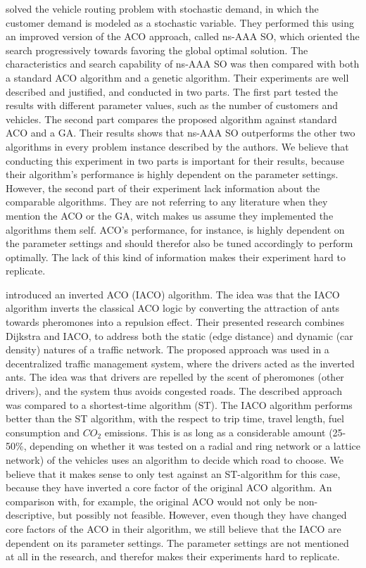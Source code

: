 \citet{tripathi09} solved the vehicle routing problem with stochastic demand, in which the customer demand is modeled as a stochastic variable. They performed this using an improved version of the ACO approach, called ns-AAA SO, which oriented the search progressively towards favoring the global optimal solution. The characteristics and search capability of ns-AAA SO was then compared with both a standard ACO algorithm and a genetic algorithm. Their experiments are well described and justified, and conducted in two parts. The first part tested the results with different parameter values, such as the number of customers and vehicles. The second part compares the proposed algorithm against standard ACO and a GA. Their results shows that ns-AAA SO outperforms the other two algorithms in every problem instance described by the authors. We believe that conducting this experiment in two parts is important for their results, because their algorithm's performance is highly dependent on the parameter settings. However, the second part of their experiment lack information about the comparable algorithms. They are not referring to any literature when they mention the ACO or the GA, witch makes us assume they implemented the algorithms them self. ACO's performance, for instance, is highly dependent on the parameter settings and should therefor also be tuned accordingly to perform optimally. The lack of this kind of information makes their experiment hard to replicate. 

\citet{dias14} introduced an inverted ACO (IACO) algorithm. The idea was that the IACO algorithm inverts the classical ACO logic by converting the attraction of ants towards pheromones into a repulsion effect. Their presented research combines Dijkstra and IACO, to address both the static (edge distance) and dynamic (car density) natures of a traffic network. The proposed approach was used in a decentralized traffic management system, where the drivers acted as the inverted ants. The idea was that drivers are repelled by the scent of pheromones (other drivers), and the system thus avoids congested roads. The described approach was compared to a shortest-time algorithm (ST). The IACO algorithm performs better than the ST algorithm, with the respect to trip time, travel length, fuel consumption and $CO_2$ emissions. This is as long as a considerable amount (25-50\%, depending on whether it was tested on a radial and ring network or a lattice network) of the vehicles uses an algorithm to decide which road to choose. We believe that it makes sense to only test against an ST-algorithm for this case, because they have inverted a core factor of the original ACO algorithm. An comparison with, for example, the original ACO would not only be non-descriptive, but possibly not feasible. However, even though they have changed core factors of the ACO in their algorithm, we still believe that the IACO are dependent on its parameter settings. The parameter settings are not mentioned at all in the research, and therefor makes their experiments hard to replicate. 


